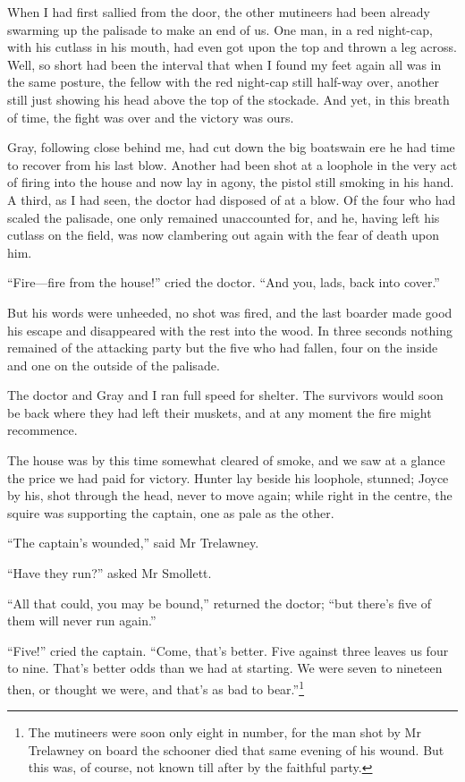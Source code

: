 When I had first sallied from the door, the other mutineers had been already swarming up the palisade to make an end of us. One man, in a red night-cap, with his cutlass in his mouth, had even got upon the top and thrown a leg across. Well, so short had been the interval that when I found my feet again all was in the same posture, the fellow with the red night-cap still half-way over, another still just showing his head above the top of the stockade. And yet, in this breath of time, the fight was over and the victory was ours.

Gray, following close behind me, had cut down the big boatswain ere he had time to recover from his last blow. Another had been shot at a loophole in the very act of firing into the house and now lay in agony, the pistol still smoking in his hand. A third, as I had seen, the doctor had disposed of at a blow. Of the four who had scaled the palisade, one only remained unaccounted for, and he, having left his cutlass on the field, was now clambering out again with the fear of death upon him.

\enquote{Fire---fire from the house!} cried the doctor. \enquote{And you, lads, back into cover.}

But his words were unheeded, no shot was fired, and the last boarder made good his escape and disappeared with the rest into the wood. In three seconds nothing remained of the attacking party but the five who had fallen, four on the inside and one on the outside of the palisade.

The doctor and Gray and I ran full speed for shelter. The survivors would soon be back where they had left their muskets, and at any moment the fire might recommence.

The house was by this time somewhat cleared of smoke, and we saw at a glance the price we had paid for victory. Hunter lay beside his loophole, stunned; Joyce by his, shot through the head, never to move again; while right in the centre, the squire was supporting the captain, one as pale as the other.

\enquote{The captain’s wounded,} said Mr Trelawney.

\enquote{Have they run?} asked Mr Smollett.

\enquote{All that could, you may be bound,} returned the doctor; \enquote{but there’s five of them will never run again.}

\enquote{Five!} cried the captain. \enquote{Come, that’s better. Five against three leaves us four to nine. That’s better odds than we had at starting. We were seven to nineteen then, or thought we were, and that’s as bad to bear.}\footnote{The mutineers were soon only eight in number, for the man shot by Mr Trelawney on board the schooner died that same evening of his wound. But this was, of course, not known till after by the faithful party.}
